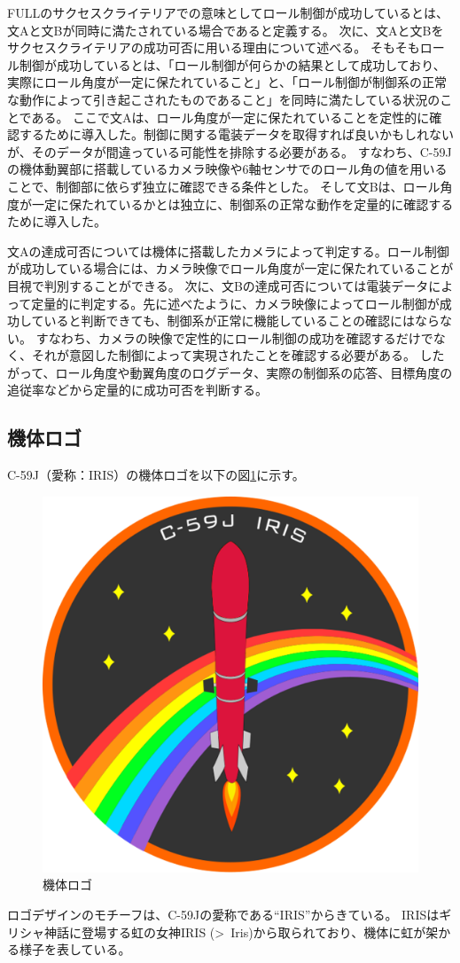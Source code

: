 \documentclass[a4paper,11pt,titlepage,uplatex]{jsarticle}
\begin{document}
FULLのサクセスクライテリアでの意味としてロール制御が成功しているとは、文Aと文Bが同時に満たされている場合であると定義する。
次に、文Aと文Bをサクセスクライテリアの成功可否に用いる理由について述べる。
そもそもロール制御が成功しているとは、「ロール制御が何らかの結果として成功しており、実際にロール角度が一定に保たれていること」と、「ロール制御が制御系の正常な動作によって引き起こされたものであること」を同時に満たしている状況のことである。
ここで文Aは、ロール角度が一定に保たれていることを定性的に確認するために導入した。制御に関する電装データを取得すれば良いかもしれないが、そのデータが間違っている可能性を排除する必要がある。
すなわち、C-59Jの機体動翼部に搭載しているカメラ映像や6軸センサでのロール角の値を用いることで、制御部に依らず独立に確認できる条件とした。
そして文Bは、ロール角度が一定に保たれているかとは独立に、制御系の正常な動作を定量的に確認するために導入した。

文Aの達成可否については機体に搭載したカメラによって判定する。ロール制御が成功している場合には、カメラ映像でロール角度が一定に保たれていることが目視で判別することができる。
次に、文Bの達成可否については電装データによって定量的に判定する。先に述べたように、カメラ映像によってロール制御が成功していると判断できても、制御系が正常に機能していることの確認にはならない。
すなわち、カメラの映像で定性的にロール制御の成功を確認するだけでなく、それが意図した制御によって実現されたことを確認する必要がある。
したがって、ロール角度や動翼角度のログデータ、実際の制御系の応答、目標角度の追従率などから定量的に成功可否を判断する。

\newpage
\subsection{機体ロゴ}
C-59J（愛称：IRIS）の機体ロゴを以下の図\ref{fig:sum_kitairogo}に示す。
\begin{figure}[H]
    \centering
    \includegraphics[width=0.5\linewidth]{pic_summary/newlogo.png}
    \caption{機体ロゴ}
    \label{fig:sum_kitairogo}
\end{figure}
ロゴデザインのモチーフは、C-59Jの愛称である``IRIS''からきている。
IRISはギリシャ神話に登場する虹の女神IRIS (\foreignlanguage{greek}{{>~I}ris})から取られており、機体に虹が架かる様子を表している。
\end{document}

